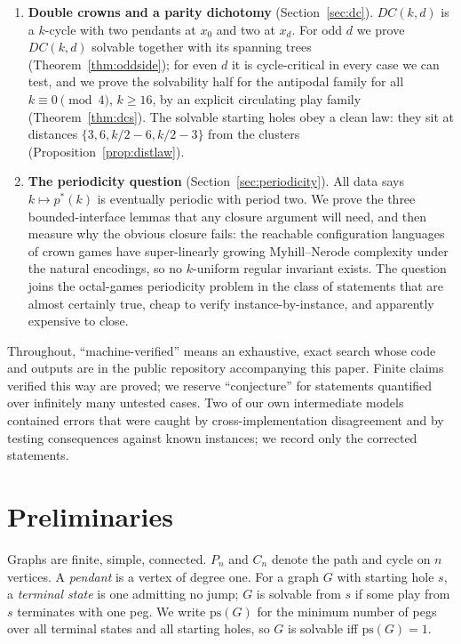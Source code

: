 \documentclass[11pt]{article}
\theoremstyle{definition}
\newcommand{\ps}{\mathrm{ps}}
\begin{document}
\begin{enumerate}
in two tiers (the best spanning tree strands two pegs in $1{,}810$
cases and three in the remaining $29$), but this does not persist:
the rescue $\min_T\ps(T)-\ps(G)$ is in fact unbounded
(Theorem~\ref{thm:rescue}), so cycle-critical graphs have arbitrarily
many tiers.
\item \textbf{Double crowns and a parity dichotomy}
(Section~\ref{sec:dc}). $DC(k,d)$ is a $k$-cycle with two pendants
at $x_0$ and two at $x_d$. For odd $d$ we prove $DC(k,d)$ solvable
together with its spanning trees (Theorem~\ref{thm:oddside}); for
even $d$ it is cycle-critical in every case we can test, and we
prove the solvability half for the antipodal family for all
$k\equiv 0\pmod 4$, $k\ge 16$, by an explicit circulating play
family (Theorem~\ref{thm:dcs}). The solvable starting holes obey a
clean law: they sit at distances $\{3,6,k/2-6,k/2-3\}$ from the
clusters (Proposition~\ref{prop:distlaw}).
\item \textbf{The periodicity question}
(Section~\ref{sec:periodicity}). All data says $k\mapsto p^*(k)$ is
eventually periodic with period two. We prove the three
bounded-interface lemmas that any closure argument will need, and
then measure why the obvious closure fails: the reachable
configuration languages of crown games have super-linearly growing
Myhill--Nerode complexity under the natural encodings, so no
$k$-uniform regular invariant exists. The question joins the
octal-games periodicity problem \cite{GuyNowakowski} in the class of
statements that are almost certainly true, cheap to verify
instance-by-instance, and apparently expensive to close.
\end{enumerate}

Throughout, ``machine-verified'' means an exhaustive, exact search
whose code and outputs are in the public repository accompanying this
paper. Finite claims verified this way are proved; we reserve
``conjecture'' for statements quantified over infinitely many
untested cases. Two of our own intermediate models contained errors
that were caught by cross-implementation disagreement and by testing
consequences against known instances; we record only the corrected
statements.

\section{Preliminaries}\label{sec:prelim}

Graphs are finite, simple, connected. $P_n$ and $C_n$ denote the
path and cycle on $n$ vertices. A \emph{pendant} is a vertex of
degree one. For a graph $G$ with starting hole $s$, a
\emph{terminal state} is one admitting no jump; $G$ is solvable from
$s$ if some play from $s$ terminates with one peg. We write
$\ps(G)$ for the minimum number of pegs over all terminal states and
all starting holes, so $G$ is solvable iff $\ps(G)=1$.
\end{document}
